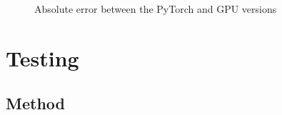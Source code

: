 \documentclass[conference]{IEEEtran}
\begin{document}
\begin{figure}[H]
  \centering
  \caption{Absolute error between the PyTorch and GPU versions}
  \label{fig:absolute_error_torch_GPU}
\end{figure}

\section{Testing}

\subsection{Method}

\end{document}
